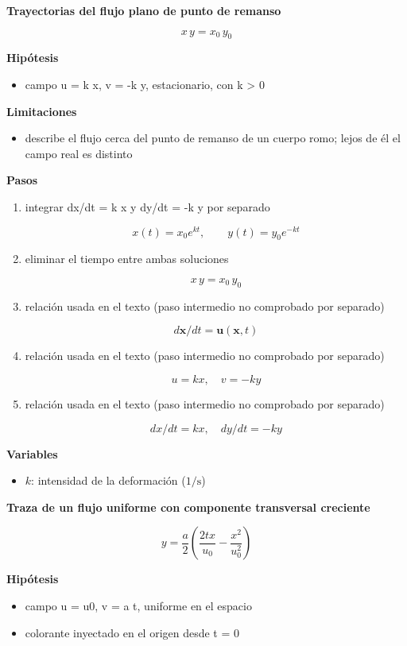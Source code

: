 \documentclass[10pt,openany]{book}
\begin{document}
\begin{tcolorbox}[title={Desarrollos del modelo}, studiumdef, breakable]
\noindent\textbf{Trayectorias del flujo plano de punto de remanso}

\begin{equation}
x\,y = x_0\,y_0
\label{eq:c04-remanso}
\end{equation}

\noindent\textbf{Hipótesis}
\begin{itemize}
\item campo u = k x, v = -k y, estacionario, con k > 0
\end{itemize}

\noindent\textbf{Limitaciones}
\begin{itemize}
\item describe el flujo cerca del punto de remanso de un cuerpo romo; lejos de él el campo real es distinto
\end{itemize}

\noindent\textbf{Pasos}
\begin{enumerate}
\item
integrar dx/dt = k x y dy/dt = -k y por separado

\[
x(t) = x_0 e^{k t},\qquad y(t) = y_0 e^{-k t}
\]
\item
eliminar el tiempo entre ambas soluciones

\[
x\,y = x_0\,y_0
\]
\item
relación usada en el texto (paso intermedio no comprobado por separado)

\[
d\mathbf{x}/dt = \mathbf{u}(\mathbf{x}, t)
\]
\item
relación usada en el texto (paso intermedio no comprobado por separado)

\[
u = kx,\quad v = -ky
\]
\item
relación usada en el texto (paso intermedio no comprobado por separado)

\[
dx/dt = kx,\quad dy/dt = -ky
\]
\end{enumerate}

\noindent\textbf{Variables}
\begin{itemize}
\item $k$: intensidad de la deformación ($\mathrm{1/s}$)
\end{itemize}



\noindent\textbf{Traza de un flujo uniforme con componente transversal creciente}

\[
y = \frac{a}{2}\left(\frac{2 t x}{u_0} - \frac{x^{2}}{u_0^{2}}\right)
\]

\noindent\textbf{Hipótesis}
\begin{itemize}
\item campo u = u0, v = a t, uniforme en el espacio
\item colorante inyectado en el origen desde t = 0
\end{itemize}


\end{tcolorbox}
\end{document}
